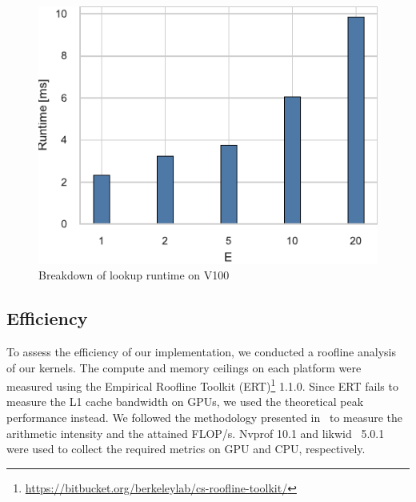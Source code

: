 \documentclass[conference]{IEEEtran}
\begin{document}
\begin{figure}
    \centering
    \includegraphics{figs/runtime_lookup_v100}
    \caption{Breakdown of lookup runtime on V100}%
    \label{fig:architecture}
\end{figure}

\subsection{Efficiency}

To assess the efficiency of our implementation, we conducted a roofline
analysis~\cite{Williams2008} of our kernels. The compute and memory ceilings
on each platform were measured using the Empirical Roofline Toolkit (ERT)\footnote{\url{https://bitbucket.org/berkeleylab/cs-roofline-toolkit/}} 1.1.0.
Since ERT fails to measure the L1 cache bandwidth on GPUs, we used the
theoretical peak performance instead. We followed the methodology presented
in~\cite{Yang2020a,Yang2020b} to measure the arithmetic intensity and the
attained FLOP/s. Nvprof 10.1 and likwid~\cite{Treibig2010} 5.0.1 were used to
collect the required metrics on GPU and CPU, respectively.

\end{document}
